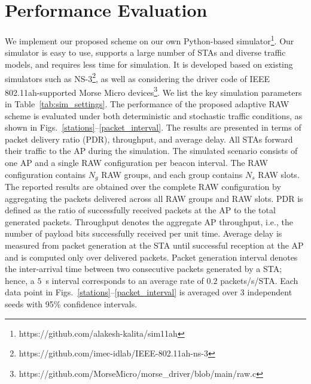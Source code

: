 \documentclass[journal]{IEEEtran}
\newcommand{\rev}[1]{{\color{blue}#1}}
\newcommand{\new}[1]{{\color{red}#1}}
\begin{document}
\section{Performance Evaluation}

We implement our proposed scheme on our own Python-based simulator\footnote{https://github.com/alakesh-kalita/sim11ah}. Our simulator is easy to use, supports a large number of STAs and diverse traffic models, and requires less time for simulation. It is developed based on existing simulators such as NS-3\footnote{https://github.com/imec-idlab/IEEE-802.11ah-ns-3}, as well as considering the driver code of IEEE 802.11ah-supported Morse Micro devices\footnote{https://github.com/MorseMicro/morse\_driver/blob/main/raw.c}. We list the key simulation parameters in Table~\ref{tab:sim_settings}. The performance of the proposed adaptive RAW scheme is evaluated under both deterministic and stochastic traffic conditions, as shown in Figs.~\ref{stations}--\ref{packet_interval}. The results are presented in terms of packet delivery ratio (PDR), throughput, and average delay. All STAs forward their traffic to the AP during the simulation. \rev{The simulated scenario consists of one AP and a single RAW configuration per beacon interval. The RAW configuration contains $N_g$ RAW groups, and each group contains $N_s$ RAW slots. The reported results are obtained over the complete RAW configuration by aggregating the packets delivered across all RAW groups and RAW slots. PDR is defined as the ratio of successfully received packets at the AP to the total generated packets. Throughput denotes the aggregate AP throughput, i.e., the number of payload bits successfully received per unit time. Average delay is measured from packet generation at the STA until successful reception at the AP and is computed only over delivered packets. Packet generation interval denotes the inter-arrival time between two consecutive packets generated by a STA; hence, a $5$~s interval corresponds to an average rate of $0.2$ packets/s/STA.} \new{Each data point in Figs.~\ref{stations}--\ref{packet_interval} is averaged over 3 independent seeds with 95\% confidence intervals.}
\end{document}
